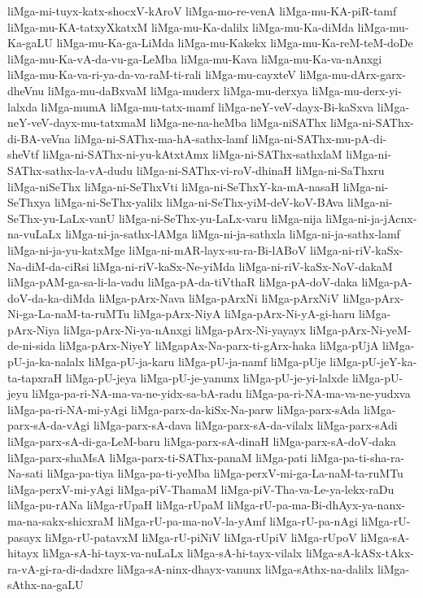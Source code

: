 {liMga-mi-tuyx-katx-shocxV-kAroV
liMga-mo-re-venA
liMga-mu-KA-piR-tamf
liMga-mu-KA-tatxyXkatxM
liMga-mu-Ka-dalilx
liMga-mu-Ka-diMda
liMga-mu-Ka-gaLU
liMga-mu-Ka-ga-LiMda
liMga-mu-Kakekx
liMga-mu-Ka-reM-teM-doDe
liMga-mu-Ka-vA-da-vu-ga-LeMba
liMga-mu-Kava
liMga-mu-Ka-va-nAnxgi
liMga-mu-Ka-va-ri-ya-da-va-raM-ti-rali
liMga-mu-cayxteV
liMga-mu-dArx-garx-dheVnu
liMga-mu-daBxvaM
liMga-muderx
liMga-mu-derxya
liMga-mu-derx-yi-lalxda
liMga-mumA
liMga-mu-tatx-mamf
liMga-neY-veV-dayx-Bi-kaSxva
liMga-neY-veV-dayx-mu-tatxmaM
liMga-ne-na-heMba
liMga-niSAThx
liMga-ni-SAThx-di-BA-veVna
liMga-ni-SAThx-ma-hA-sathx-lamf
liMga-ni-SAThx-mu-pA-di-sheVtf
liMga-ni-SAThx-ni-yu-kAtxtAmx
liMga-ni-SAThx-sathxlaM
liMga-ni-SAThx-sathx-la-vA-dudu
liMga-ni-SAThx-vi-roV-dhinaH
liMga-ni-SaThxru
liMga-niSeThx
liMga-ni-SeThxVti
liMga-ni-SeThxY-ka-mA-nasaH
liMga-ni-SeThxya
liMga-ni-SeThx-yalilx
liMga-ni-SeThx-yiM-deV-koV-BAva
liMga-ni-SeThx-yu-LaLx-vanU
liMga-ni-SeThx-yu-LaLx-varu
liMga-nija
liMga-ni-ja-jAcnx-na-vuLaLx
liMga-ni-ja-sathx-lAMga
liMga-ni-ja-sathxla
liMga-ni-ja-sathx-lamf
liMga-ni-ja-yu-katxMge
liMga-ni-mAR-layx-su-ra-Bi-lABoV
liMga-ni-riV-kaSx-Na-diM-da-ciRsi
liMga-ni-riV-kaSx-Ne-yiMda
liMga-ni-riV-kaSx-NoV-dakaM
liMga-pAM-ga-sa-li-la-vadu
liMga-pA-da-tiVthaR
liMga-pA-doV-daka
liMga-pA-doV-da-ka-diMda
liMga-pArx-Nava
liMga-pArxNi
liMga-pArxNiV
liMga-pArx-Ni-ga-La-naM-ta-ruMTu
liMga-pArx-NiyA
liMga-pArx-Ni-yA-gi-haru
liMga-pArx-Niya
liMga-pArx-Ni-ya-nAnxgi
liMga-pArx-Ni-yayayx
liMga-pArx-Ni-yeM-de-ni-sida
liMga-pArx-NiyeY
liMgapAx-Na-parx-ti-gArx-haka
liMga-pUjA
liMga-pU-ja-ka-nalalx
liMga-pU-ja-karu
liMga-pU-ja-namf
liMga-pUje
liMga-pU-jeY-ka-ta-tapxraH
liMga-pU-jeya
liMga-pU-je-yanunx
liMga-pU-je-yi-lalxde
liMga-pU-jeyu
liMga-pa-ri-NA-ma-va-ne-yidx-sa-bA-radu
liMga-pa-ri-NA-ma-va-ne-yudxva
liMga-pa-ri-NA-mi-yAgi
liMga-parx-da-kiSx-Na-parw
liMga-parx-sAda
liMga-parx-sA-da-vAgi
liMga-parx-sA-dava
liMga-parx-sA-da-vilalx
liMga-parx-sAdi
liMga-parx-sA-di-ga-LeM-baru
liMga-parx-sA-dinaH
liMga-parx-sA-doV-daka
liMga-parx-shaMsA
liMga-parx-ti-SAThx-panaM
liMga-pati
liMga-pa-ti-sha-ra-Na-sati
liMga-pa-tiya
liMga-pa-ti-yeMba
liMga-perxV-mi-ga-La-naM-ta-ruMTu
liMga-perxV-mi-yAgi
liMga-piV-ThamaM
liMga-piV-Tha-va-Le-ya-lekx-raDu
liMga-pu-rANa
liMga-rUpaH
liMga-rUpaM
liMga-rU-pa-ma-Bi-dhAyx-ya-nanx-ma-na-sakx-shicxraM
liMga-rU-pa-ma-noV-la-yAmf
liMga-rU-pa-nAgi
liMga-rU-pasayx
liMga-rU-patavxM
liMga-rU-piNiV
liMga-rUpiV
liMga-rUpoV
liMga-sA-hitayx
liMga-sA-hi-tayx-va-nuLaLx
liMga-sA-hi-tayx-vilalx
liMga-sA-kASx-tAkx-ra-vA-gi-ra-di-dadxre
liMga-sA-ninx-dhayx-vanunx
liMga-sAthx-na-dalilx
liMga-sAthx-na-gaLU
}
